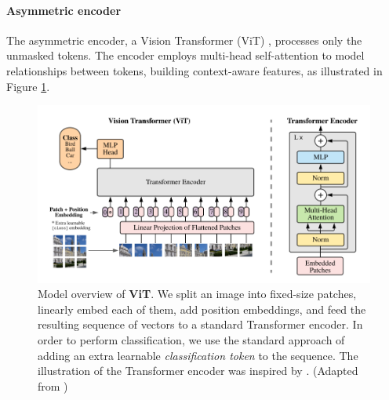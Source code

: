 \paragraph{Asymmetric encoder} The asymmetric encoder, a Vision Transformer (ViT) \parencite{vit}, processes only the unmasked tokens. 
The encoder employs multi-head self-attention to model relationships between tokens, building context-aware features, as illustrated in Figure \ref{fig:vit}.
\begin{figure}[H]
    \centering
    \includegraphics[width=0.8\linewidth]{img_pfe/vit.PNG}
    \caption{Model overview of \textbf{ViT}. We split an image into fixed-size patches, linearly embed each of them, add position embeddings, and feed the resulting sequence of vectors to a standard Transformer encoder. In order to perform classification, we use the standard approach of adding an extra learnable \textit{classification token} to the sequence. The illustration of the Transformer encoder was inspired by \parencite{attention_is_all_you_need}. (Adapted from \parencite{vit})}
    \label{fig:vit}
\end{figure}
        
        
